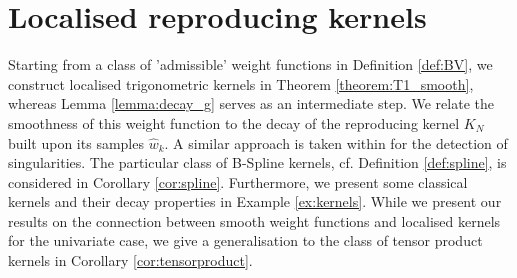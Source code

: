 \documentclass[11pt,a4paper,bibtotoc]{scrartcl}
\numberwithin{equation}{section}
\numberwithin{table}{section}
\numberwithin{figure}{section}
\begin{document}
\section{Localised reproducing kernels}\label{sect:kernels}
Starting from a class of 'admissible' weight functions in Definition
\ref{def:BV}, we construct localised trigonometric kernels in Theorem
\ref{theorem:T1_smooth}, whereas Lemma \ref{lemma:decay_g} serves as an
intermediate step.
We relate the smoothness of this weight function to the decay of the
reproducing kernel $K_N$ built upon its samples $\hat w_k$.
A similar approach is taken within \cite[Thm. 2.2]{MhPr00} for the detection
of singularities.
The particular class of B-Spline kernels, cf. Definition \ref{def:spline}, is
considered in Corollary \ref{cor:spline}.
Furthermore, we present some classical kernels and their decay properties in
Example \ref{ex:kernels}.
While we present our results on the connection between smooth weight functions
and localised kernels for the univariate case, we give a generalisation to the
class of tensor product kernels in Corollary \ref{cor:tensorproduct}.
\end{document}
